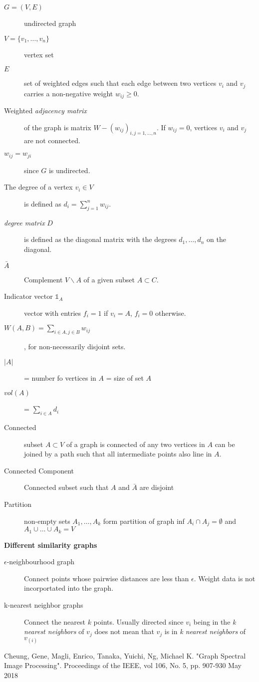 \documentclass[10pt,a4paper, nocenter]{report}
\begin{document}
		\begin{description}
			\item[$G=(V,E)$] undirected graph
			\item[$V=\{v_{1},\dots,v_{n}\}$] vertex set
			\item[$E$] set of weighted edges  such that each edge between two vertices $v_{i}$ and $v_{j}$ carries a non-negative weight $w_{ij} \ge 0$. 
			\item[Weighted \textit{adjacency matrix}] of the graph is matrix $W-(w_{ij})_{i,j=1,\dots,n}$. If $w_{ij}=0$, vertices $v_{i}$ and $v_{j}$ are not connected. 
			\item[$w_{ij}=w_{ji}$] since $G$ is undirected. 
			\item[The degree of a vertex $v_{i}\in V$] is defined as $ d_{i} = \sum_{j=1}^{n}w_{ij}$. 
			\item[\textit{degree matrix} $D$] is defined as the diagonal matrix with the degrees $d_{1} ,\dots, d_{n}$ on the diagonal. 
			\item[$\bar{A}$] Complement $V \backslash A$  of a given subset $A \subset C$.
			\item[Indicator vector $\mathbb{1}_{A}$] vector with entries $f_{i} = 1$ if $v_{i}=A$, $f_{i}=0$ otherwise.
			\item[$W(A,B) = \sum_{i\in A, j\in B}w_{ij}$], for non-necessarily disjoint sets. 
			\item[$\lvert A \rvert$] = number fo vertices in $A$ = size of set $A$
			\item[$vol(A)$]  = $\sum_{i\in A}d_{i}$
			\item[Connected] subset $A \subset V$ of a graph is connected of any two vertices in $A$ can be joined by a path such that all intermediate points also line in $A$.
			\item[Connected Component] Connected subset such that $A$ and $\bar{A}$ are disjoint
			\item[Partition] non-empty sets $A_{1},\dots,A_{k}$ form partition of graph inf $A_{i} \cap A_{j} = \emptyset$ and $A_{1}\cup \dots \cup A_{k} = V$
		\end{description}	
	
		\textbf{Different similarity graphs}
		\begin{description}
			\item[$\epsilon$-neighbourhood graph] Connect points whose pairwise distances are less than $\epsilon$. Weight data is not incorportated into the graph. 
			\item[k-nearest neighbor graphs] Connect the nearest $k$ points. Usually directed since $v_{i}$ being in the \textit{k nearest neighbors} of $v_{j}$ does not mean that $v_{j}$ is in \textit{k nearest neighbors} of $v_(i)$
		\end{description}
	\thispagestyle{fancy}
	\begin{thebibliography}{9}
	\thispagestyle{fancy}
		Cheung, Gene, Magli, Enrico, Tanaka, Yuichi, Ng, Michael K. "Graph Spectral Image Processing". Proceedings of the IEEE, vol 106, No. 5, pp. 907-930 May 2018

	\end{thebibliography}
\end{document}
